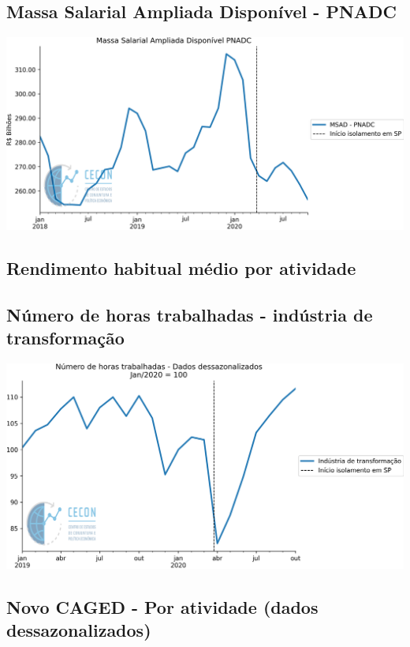\documentclass{SelfArx}
\begin{document}
\subsection*{Massa Salarial Ampliada Disponível - PNADC}
\label{sec:org372f898}

\begin{center}
\includegraphics[width=.9\linewidth]{./figs/Emprego/MSAD.png}
\end{center}

\subsection*{Rendimento habitual médio por atividade}
\label{sec:org26426aa}

\subsection*{Número de horas trabalhadas - indústria de transformação}
\label{sec:orgfee78f3}

\begin{center}
\includegraphics[width=.9\linewidth]{./figs/Emprego/Horas_Transformacao.png}
\end{center}

\subsection*{Novo CAGED  - Por atividade (dados dessazonalizados)}
\label{sec:org1c445b5}
\end{document}
